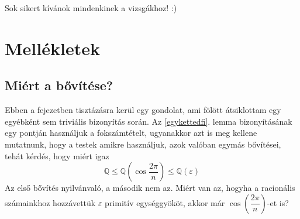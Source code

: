 \documentclass[12pt]{book}
\theoremstyle{plain} %
\theoremstyle{definition} %
\theoremstyle{remark}
\numberwithin{equation}{section}  %
\def\Q{\mathbb{Q}}
\begin{document}
	Sok sikert kívánok mindenkinek a vizsgákhoz! :)
	
	

	
	
	
	\chapter*{Mellékletek}
	\setcounter{chapter}{\thechapter+1}
	\setcounter{section}{0}
	\section{Miért a bővítése?}
	Ebben a fejezetben tisztázásra kerül egy gondolat, ami fölött átsiklottam egy egyébként sem triviális bizonyítás során. Az \ref{egykettedfi}. lemma bizonyításának egy pontján használjuk a fokszámtételt, ugyanakkor azt is meg kellene mutatnunk, hogy a testek amikre használjuk, azok valóban egymás bővítései, tehát kérdés, hogy miért igaz
	\[ \mathbb{Q} \leq \Q\left (\cos \dfrac{2\pi}{n} \right) \leq \Q(\varepsilon) \]
	Az első bővítés nyilvánvaló, a második nem az. Miért van az, hogyha a racionális számainkhoz hozzávettük $\varepsilon$ primitív egységgyököt, akkor már $\cos \left( \dfrac{2\pi}{n} \right) $-et is?
	
\end{document}
